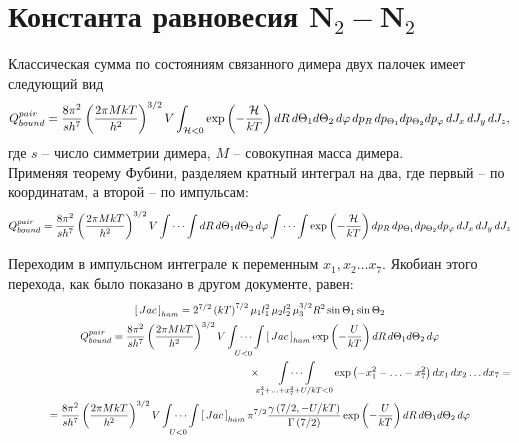 \documentclass[12pt]{article}
\newcommand{\lb}{\left(}
\newcommand{\rb}{\right)}
\newcommand{\mH}{\mathcal{H}}
\begin{document}
\newpage

\section*{Константа равновесия N$_2-$N$_2$}

Классическая сумма по состояниям связанного димера двух палочек имеет следующий вид
\begin{gather}
		Q_{bound}^{pair} = \frac{8 \pi^2}{s h^7} \lb \frac{2 \pi M k T}{h^2} \rb^{3/2} V \int_{\mH < 0} \exp \lb - \frac{\mH}{kT} \rb dR \, d \Theta_1 d \Theta_2 \, d \varphi \, d p_R \, d p_{\Theta_1} d p_{\Theta_2} d p_\varphi \, d J_x \, d J_y \, d J_z, \notag 
\end{gather}
где $s$ -- число симметрии димера, $M$ -- совокупная масса димера. \\
Применяя теорему Фубини, разделяем кратный интеграл на два, где первый -- по координатам, а второй -- по импульсам: 
\begin{gather}
	Q_{bound}^{pair} = \frac{8 \pi^2}{s h^7} \lb \frac{2 \pi M k T}{h^2} \rb^{3/2} V \idotsint dR \, d \Theta_1 d \Theta_2 \, d \varphi \idotsint \exp \lb - \frac{\mH}{kT} \rb d p_R \, d p_{\Theta_1} d p_{\Theta_2} d p_\varphi \, d J_x \, d J_y \, d J_z \notag  
\end{gather}

Переходим в импульсном интеграле к переменным $x_1, x_2 \ldots x_7$. Якобиан этого перехода, как было показано в другом документе, равен:
\begin{gather}
		\left[ \, Jac \, \right]_{ham} = 2^{7/2} \lb k T \rb^{7/2} \mu_1 l_1^2 \, \mu_2 l_2^2 \, \mu_3^{3/2} R^2 \sin \Theta_1 \sin \Theta_2 \notag \\
	Q_{bound}^{pair} = \frac{8 \pi^2}{s h^7} \lb \frac{2 \pi M k T}{h^2} \rb^{3/2} V \idotsint\limits_{U < 0} \left[ \, Jac \, \right]_{ham} \exp \lb -\frac{U}{kT} \rb d R \, d \Theta_1 d \Theta_2 \, d \varphi \notag \\
	\hspace{8cm} \times \idotsint\limits_{x_1^2 + \ldots + x_7^2 + U/kT < 0} \exp \lb - x_1^2 - \ldots -x_7^2 \rb d x_1 \, d x_2 \ldots d x_7  = \notag \\
	= \frac{8 \pi^2}{s h^7} \lb \frac{2 \pi M k T}{h^2} \rb^{3/2} V \idotsint\limits_{U < 0} \left[ \, Jac \, \right]_{ham} \pi^{7/2} \frac{\gamma \lb 7/2, - U/kT \rb}{\Gamma \lb 7/2 \rb} \exp \lb - \frac{U}{kT} \rb dR \, d \Theta_1 d \Theta_2 \, d \varphi \notag 
\end{gather}
\end{document}
